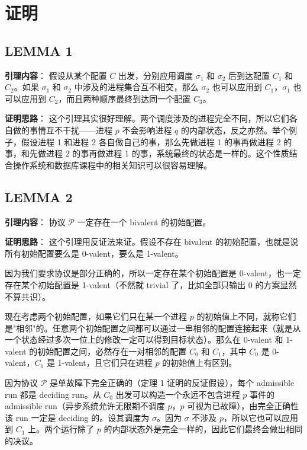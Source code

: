 \documentclass[12pt, a4paper]{ctexart}
\theoremstyle{definition}
\theoremstyle{plain}
\theoremstyle{remark}
\begin{document}
\section{证明}

\subsection{LEMMA 1}

\textbf{引理内容}：
假设从某个配置 $C$ 出发，分别应用调度 $\sigma_1$ 和 $\sigma_2$ 后到达配置 $C_1$ 和 $C_2$。如果 $\sigma_1$ 和 $\sigma_2$ 中涉及的进程集合互不相交，那么 $\sigma_2$ 也可以应用到 $C_1$，$\sigma_1$ 也可以应用到 $C_2$，而且两种顺序最终到达同一个配置 $C_3$。

\textbf{证明思路}：
这个引理其实很好理解。两个调度涉及的进程完全不同，所以它们各自做的事情互不干扰——进程 $p$ 不会影响进程 $q$ 的内部状态，反之亦然。举个例子，假设进程 1 和进程 2 各自做自己的事，那么先做进程 1 的事再做进程 2 的事，和先做进程 2 的事再做进程 1 的事，系统最终的状态是一样的。这个性质结合操作系统和数据库课程中的相关知识可以很容易理解。


\subsection{LEMMA 2}

\textbf{引理内容}：
协议 $\mathcal{P}$ 一定存在一个 bivalent 的初始配置。

\textbf{证明思路}：
这个引理用反证法来证。假设不存在 bivalent 的初始配置，也就是说所有初始配置要么是 0-valent，要么是 1-valent。

因为我们要求协议是部分正确的，所以一定存在某个初始配置是 0-valent，也一定存在某个初始配置是 1-valent（不然就 trivial 了，比如全部只输出 0 的方案显然不算共识）。

现在考虑两个初始配置，如果它们只在某一个进程 $p$ 的初始值上不同，就称它们是"相邻"的。任意两个初始配置之间都可以通过一串相邻的配置连接起来（就是从一个状态经过多次一位上的修改一定可以得到目标状态）。那么在 0-valent 和 1-valent 的初始配置之间，必然存在一对相邻的配置 $C_0$ 和 $C_1$，其中 $C_0$ 是 0-valent，$C_1$ 是 1-valent，且它们只在进程 $p$ 的初始值上有区别。

因为协议 $\mathcal{P}$ 是单故障下完全正确的（定理 1 证明的反证假设），每个 admissible run 都是 deciding run。从 $C_0$ 出发可以构造一个永远不包含进程 $p$ 事件的 admissible run（异步系统允许无限期不调度 $p$，$p$ 可视为已故障），由完全正确性该 run 一定是 deciding 的。设其调度为 $\sigma$。因为 $\sigma$ 不涉及 $p$，所以它也可以应用到 $C_1$ 上。两个运行除了 $p$ 的内部状态外是完全一样的，因此它们最终会做出相同的决议。
\end{document}
